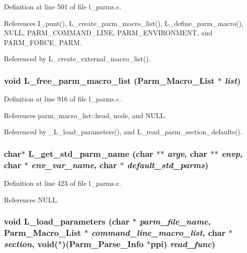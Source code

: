 Definition at line 501 of file l\_\-parms.c.

References I\_\-punt(), L\_\-create\_\-parm\_\-macro\_\-list(), L\_\-define\_\-parm\_\-macro(), NULL, PARM\_\-COMMAND\_\-LINE, PARM\_\-ENVIRONMENT, and PARM\_\-FORCE\_\-PARM.

Referenced by L\_\-create\_\-external\_\-macro\_\-list().
\subsubsection{\setlength{\rightskip}{0pt plus 5cm}void L\_\-free\_\-parm\_\-macro\_\-list (\bf{Parm\_\-Macro\_\-List} $\ast$ {\em list})}\label{l__parms_8h_d4b06aa55eb13d77d7d2884ae752aef8}




Definition at line 916 of file l\_\-parms.c.

References parm\_\-macro\_\-list::head, node, and NULL.

Referenced by \_\-L\_\-load\_\-parameters(), and L\_\-read\_\-parm\_\-section\_\-defaults().
\subsubsection{\setlength{\rightskip}{0pt plus 5cm}char$\ast$ L\_\-get\_\-std\_\-parm\_\-name (char $\ast$$\ast$ {\em argv}, char $\ast$$\ast$ {\em envp}, char $\ast$ {\em env\_\-var\_\-name}, char $\ast$ {\em default\_\-std\_\-parms})}\label{l__parms_8h_388daec74010abed75e1a0530d065c97}




Definition at line 423 of file l\_\-parms.c.

References NULL.
\subsubsection{\setlength{\rightskip}{0pt plus 5cm}void L\_\-load\_\-parameters (char $\ast$ {\em parm\_\-file\_\-name}, \bf{Parm\_\-Macro\_\-List} $\ast$ {\em command\_\-line\_\-macro\_\-list}, char $\ast$ {\em section}, void($\ast$)(\bf{Parm\_\-Parse\_\-Info} $\ast$ppi) {\em read\_\-func})}\label{l__parms_8h_80475b4cf1dc53921096f8756a16b542}




